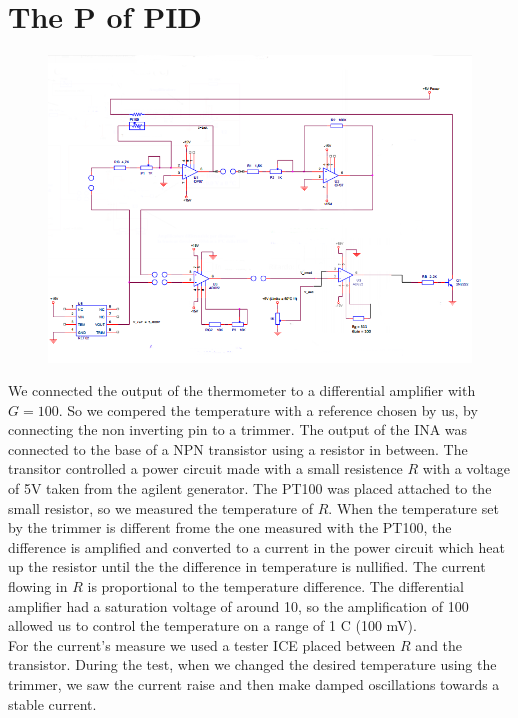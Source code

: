 \section{The P of PID}
\begin{figure}[H]
\centering
\includegraphics[width=.8\textwidth]{6/circuit2.png}
\end{figure}
We connected the output of the thermometer to a differential amplifier with $G=100$. So we compered the temperature with a reference chosen by us, by connecting the non inverting pin to a trimmer. The output of the INA was connected to the base of a NPN transistor using a resistor in between. The transitor controlled a power circuit made with a small resistence $R$ with a voltage of 5V taken from the agilent generator. The PT100 was placed attached to the small resistor, so we measured the temperature of $R$. When the temperature set by the trimmer is different frome the one measured with the PT100, the difference is amplified and converted to a current in the power circuit which heat up the resistor until the the difference in temperature is nullified. The current flowing in $R$ is proportional to the temperature difference. The differential amplifier had a saturation voltage of around 10, so the amplification of 100 allowed us to control the temperature on a range of 1 \degree C (100 mV).\\
For the current's measure we used a tester ICE placed between $R$ and the transistor. During the test, when we changed the desired temperature using the trimmer, we saw the current raise and then make damped oscillations towards a stable current.
